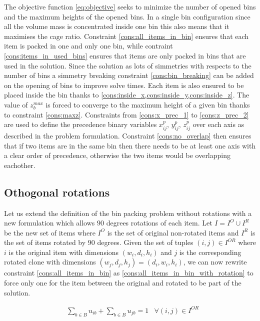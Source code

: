 The objective function \ref{eq:objective} seeks to minimize the number of opened bins and the maximum heights of the opened bins.
In a single bin configuration since all the volume mass is concentrated inside one bin this also means that it maximises the cage ratio.
Constraint \ref{cons:all_items_in_bin} ensures that each item is packed in one and only one bin, while contraint \ref{cons:items_in_used_bins} ensures that items are only packed in bins that are used in the solution.
Since the solution as lots of simmetries with respects to the number of bins a simmetry breaking constraint \ref{cons:bin_breaking} can be added on the opening of bins to improve solve times.
Each item is also ensured to be placed inside the bin thanks to \cref{cons:inside_x,cons:inside_y,cons:inside_z}.
The value of $z^{max}_b$ is forced to converge to the maximum height of a given bin thanks to constraint \ref{cons:maxz}.
Constraints from \ref{cons:x_prec_1} to \ref{cons:z_prec_2} are used to define the precedence binary variables $x^p_{ij}$, $y^p_{ij}$, $z^p_{ij}$ over each axis as described in the problem formulation.
Constraint \ref{cons:no_overlap} then ensures that if two items are in the same bin then there needs to be at least one axis with a clear order of precedence, otherwise the two items would be overlapping eachother.
\subsection{Othogonal rotations}
\label{subsec:orthogonal_rotations}%

Let us extend the definition of the bin packing problem without rotations with a new formulation which allows $90$ degrees rotations of each item.
Let $I = I^O \cup I^R$ be the new set of items where $I^O$ is the set of original non-rotated items and $I^R$ is the set of items rotated by $90$ degrees.
Given the set of tuples $(i, j) \in I^{OR}$ where $i$ is the original item with dimensions $(w_i, d_i, h_i)$ and $j$ is the corresponding rotated clone with dimensions $(w_j, d_j, h_j) = (d_i, w_i, h_i)$, we can now rewrite constraint \ref{cons:all_items_in_bin} as \ref{cons:all_items_in_bin_with_rotation} to force only one for the item between the original and rotated to be part of the solution.

\begin{align}
    & \sum\limits_{b \in B} u_{ib} + \sum\limits_{b \in B} u_{jb} = 1 & \forall (i, j) \in I^{OR} \label{cons:all_items_in_bin_with_rotation}
\end{align}

